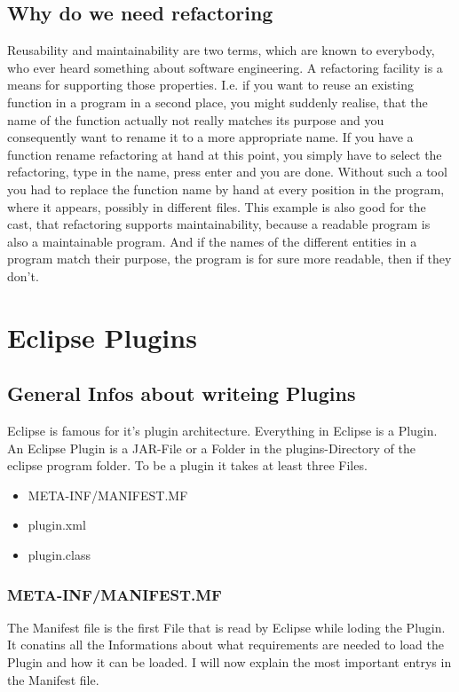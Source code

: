 \documentclass[a4paper,10pt]{report}
\begin{document}
\chapter{Why do we need refactoring}
Reusability and maintainability are two terms, which are known to everybody, who ever heard something about software engineering. 
A refactoring facility is a means for supporting those properties. I.e. if you want to reuse an existing function in a program in a second place,
you might suddenly realise, that the name of the function actually not really matches its purpose and you consequently want to rename it to a more appropriate name.
If you have a function rename refactoring at hand at this point, you simply have to select the refactoring, type in the name, press enter and you are done. 
Without such a tool you had to replace the function name by hand at every position in the program, where it appears, possibly in different files.
This example is also good for the cast, that refactoring supports maintainability, because a readable program is also a maintainable program. 
And if the names of the different entities in a program match their purpose, the program is for sure more readable, then if they don't.

\part{Eclipse Plugins}
\chapter{General Infos about writeing Plugins}
Eclipse is famous for it's plugin architecture. Everything in Eclipse is a Plugin. An Eclipse Plugin is a JAR-File or a Folder in the plugins-Directory of the eclipse program folder.
To be a plugin it takes at least three Files.
\begin{itemize}
  \item META-INF/MANIFEST.MF
  \item plugin.xml
  \item plugin.class
\end{itemize}

\section{META-INF/MANIFEST.MF}
The Manifest file is the first File that is read by Eclipse while loding the Plugin. It conatins all the Informations about what requirements 
are needed to load the Plugin and how it can be loaded. I will now explain the most important entrys in the Manifest file.
\end{document}
